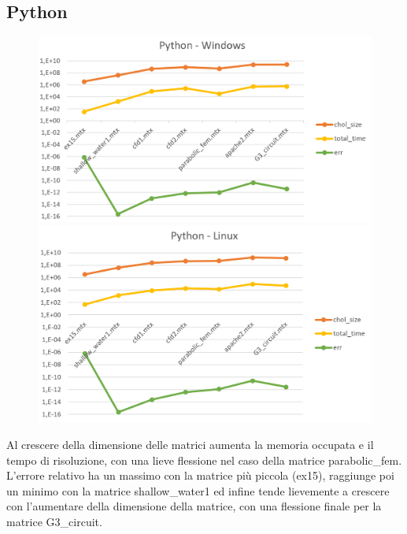 \documentclass[a4paper,10pt]{article}
\begin{document}
\subsection{Python}

\begin{figure}[H]
\centering
\begin{minipage}{.6\textwidth}
  \centering
  \includegraphics[width=1\linewidth]{img/pythonwin.png}
\end{minipage}%
\begin{minipage}{.6\textwidth}
  \centering
  \includegraphics[width=1\linewidth]{img/pythonlinux.png}
\end{minipage}
\end{figure}


Al crescere della dimensione delle matrici aumenta la memoria occupata e il tempo di risoluzione, con una lieve flessione nel caso della matrice parabolic\_fem.
L’errore relativo ha un massimo con la matrice più piccola (ex15), raggiunge poi un minimo con la matrice shallow\_water1 ed infine tende lievemente a crescere con l’aumentare della dimensione della matrice, con una flessione finale per la matrice G3\_circuit.
\end{document}

